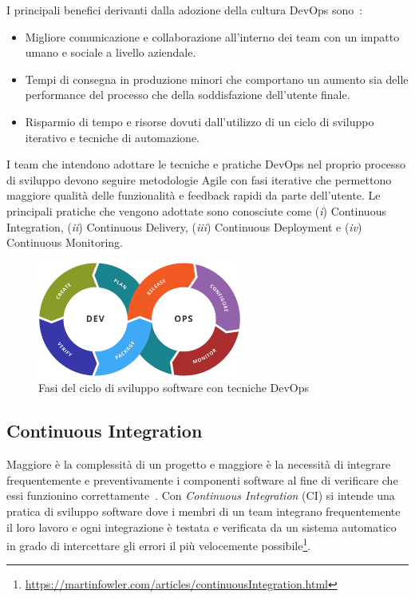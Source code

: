 I principali benefici derivanti dalla adozione della cultura DevOps sono~\cite{krief2019learning}:
\begin{itemize}
    \item Migliore comunicazione e collaborazione all'interno dei team con un impatto umano e sociale a livello aziendale.
    \item Tempi di consegna in produzione minori che comportano un aumento sia delle performance del processo che della soddisfazione dell'utente finale.
    \item Risparmio di tempo e risorse dovuti dall'utilizzo di un ciclo di sviluppo iterativo e tecniche di automazione.
\end{itemize}

I team che intendono adottare le tecniche e pratiche DevOps nel proprio processo di sviluppo devono seguire metodologie Agile con fasi iterative che permettono maggiore qualità delle funzionalità e feedback rapidi da parte dell'utente. Le principali pratiche che vengono adottate sono conosciute come (\textit{i}) Continuous Integration, (\textit{ii}) Continuous Delivery, (\textit{iii}) Continuous Deployment e (\textit{iv}) Continuous Monitoring.

\begin{figure}[H]
    \centering
    \includegraphics[width=0.6\textwidth]{img/Devops-toolchain.png}
    \caption{Fasi del ciclo di sviluppo software con tecniche DevOps}
\end{figure}

\subsection{Continuous Integration}
\label{ci-sec}
Maggiore è la complessità di un progetto e maggiore è la necessità di integrare frequentemente e preventivamente i componenti software al fine di verificare che essi funzionino correttamente~\cite{duvall2007continuous}. Con \textit{Continuous Integration} (CI) si intende una pratica di sviluppo software dove i membri di un team integrano frequentemente il loro lavoro e ogni integrazione è testata e verificata da un sistema automatico in grado di intercettare gli errori il più velocemente possibile\footnote{\href{https://martinfowler.com/articles/continuousIntegration.html}{https://martinfowler.com/articles/continuousIntegration.html}}.

